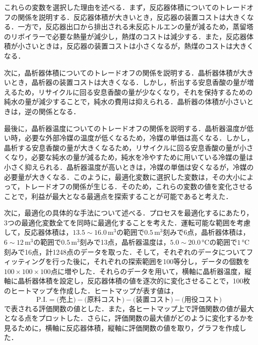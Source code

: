 \documentclass[a4j]{jsreport}
\begin{document}
これらの変数を選択した理由を述べる．まず，反応器体積についてのトレードオフの関係を説明する．反応器体積が大きいとき，反応器の装置コストは大きくなる．一方で，反応器出口から排出される未反応トルエンの量が減るため，蒸留塔のリボイラーで必要な熱量が減少し，熱煤のコストは減少する．また，反応器体積が小さいときは，反応器の装置コストは小さくなるが，熱煤のコストは大きくなる．

次に，晶析器体積についてのトレードオフの関係を説明する．晶析器体積が大きいとき，晶析器の装置コストは大きくなる．しかし，析出する安息香酸の量が増えるため，リサイクルに回る安息香酸の量が少なくなり，それを保持するための純水の量が減少することで，純水の費用は抑えられる．晶析器の体積が小さいときは，逆の関係となる．

最後に，晶析器温度についてのトレードオフの関係を説明する．晶析器温度が低い時，必要な外部冷媒の温度が低くなるため，冷媒の単価は高くなる．しかし，晶析する安息香酸の量が大きくなるため，リサイクルに回る安息香酸の量が小さくなり，必要な純水の量が減るため，純水を冷やすために用いている冷媒の量は小さく抑えられる．晶析器温度が高いときは，冷媒の単価は安くなるが，冷媒の必要量が大きくなる．このように，最適化変数に選択した変数は，その大小によって，トレードオフの関係が生じる．そのため，これらの変数の値を変化させることで，利益が最大となる最適点を探索することが可能であると考えた．

次に，最適化の具体的な手法について述べる．プロセスを最適化するにあたり，3つの最適化変数全てを同時に最適化することを考えた．運転可能な範囲を考慮して，反応器体積は，$13.5 \sim 16.0 \, \si{\cubic \metre}$の範囲で$0.5\,\si{\cubic \metre}$刻みで6点，晶析器体積は，$6 \sim 12 \, \si{\cubic \metre}$の範囲で$0.5\,\si{\cubic \metre}$刻みで13点，晶析器温度は，$5.0 \sim 20.0 \, \si{\degreeCelsius}$の範囲で$1\,\si{\degreeCelsius}$刻みで16点，計1248点のデータを取った．そして，それぞれのデータについてフィッティングを行った後に，それぞれの探索範囲を100等分し，データの個数を$100 \times 100 \times 100$点に増やした．それらのデータを用いて，横軸に晶析器温度，縦軸に晶析器体積を設定し，反応器体積の値を逐次的に変化させることで，100枚のヒートマップを作成した．ヒートマップが表す値は，
\begin{equation}
  \text{P.I.} = \text{(売上)} - \text{(原料コスト)} - \text{(装置コスト)} -\text{(用役コスト)}
\end{equation}
で表される評価関数の値とした．また，各ヒートマップ上で評価関数の値が最大となる点をプロットした．さらに，評価関数の最大値がどのように変化するかを見るために，横軸に反応器体積，縦軸に評価関数の値を取り，グラフを作成した．
\end{document}
